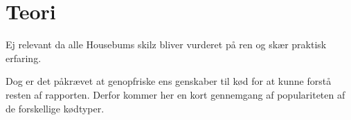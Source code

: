 \section{Teori}
Ej relevant da alle Housebums skilz bliver vurderet på ren og skær praktisk erfaring.

Dog er det påkrævet at genopfriske ens genskaber til kød for at kunne forstå resten af rapporten. Derfor kommer her en kort gennemgang af populariteten af de forskellige kødtyper.

